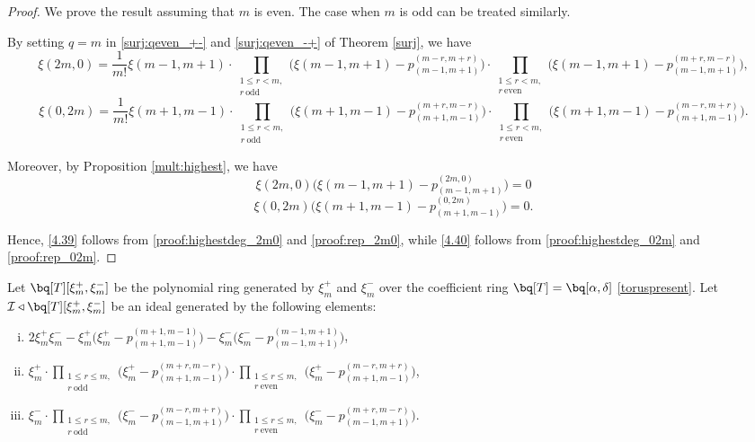 \documentclass[10pt, a4paper, reqno]{amsart}
\begin{document}
\begin{proof}
We prove the result assuming that $m$ is even. The case when $m$ is odd can be treated similarly.

By setting $q=m$ in \eqref{surj:qeven_+-} and \eqref{surj:qeven_-+} of Theorem \ref{surj}, we have 
	\begin{equation}\label{proof:rep_2m0}
	\xi(2m,0)=\displaystyle\frac{1}{ m!} \xi(m-1,m+1)\cdot\prod_{\substack{1\leq r< m ,\\ r~ \text{odd}}}\Big(\xi(m-1,m+1)-p^{(m-r,m+r)}_{(m-1,m+1)}\Big)\cdot\prod_{\substack{1\leq r< m,\\ r~ \text{even}}}\Big(\xi(m-1,m+1)-p^{(m+r,m-r)}_{(m-1,m+1)}\Big),
\end{equation}
\begin{equation}\label{proof:rep_02m}
	\xi(0,2m)=\displaystyle\frac{1}{m!}\xi(m+1,m-1)\cdot\prod_{\substack{1\leq r< m ,\\ r~ \text{odd}}}\Big(\xi(m+1,m-1)-p^{(m+r,m-r)}_{(m+1,m-1)}\Big)\cdot\prod_{\substack{1\leq r< m,\\ r~ \text{even}}}\Big(\xi(m+1,m-1)-p^{(m-r,m+r)}_{(m+1,m-1)}\Big).
\end{equation}

Moreover, by Proposition \ref{mult:highest}, we have
\begin{equation}\label{proof:highestdeg_2m0}	\xi(2m,0)\Big(\xi(m-1,m+1)-p_{(m-1,m+1)}^{(2m,0)}\Big)=0 \end{equation}	
\begin{equation}\label{proof:highestdeg_02m} \xi(0,2m)\Big(\xi(m+1,m-1)-p_{(m+1,m-1)}^{(0,2m)}\Big)=0.
\end{equation}

Hence, \eqref{4.39} follows from \eqref{proof:highestdeg_2m0} and \eqref{proof:rep_2m0}, while  \eqref{4.40} follows from \eqref{proof:highestdeg_02m} and \eqref{proof:rep_02m}.
\end{proof}




Let $\bq[T][\xi^+_m,\xi^-_m]$ be the polynomial ring generated by $\xi^+_m$ and $\xi^-_m$ over the coefficient ring $\bq[T]=\bq[\alpha,\delta]$ \eqref{toruspresent}. 
Let $\mathcal{I}\triangleleft \bq[T][\xi^+_m,\xi^-_m]$ be an ideal generated by the following  elements:
\begin{enumerate}[(i)]
	\item $			2\xi^+_m\xi^-_m-\xi^+_m\Big(\xi^+_m-p^{(m+1,m-1)}_{(m+1,m-1)}\Big)-\xi^-_m\Big(\xi^-_m-p^{(m-1,m+1)}_{(m-1,m+1)}\Big)$,
	\item $ \xi^+_m\cdot\prod_{\substack{1\leq r\leq m ,\\ r~ \text{odd}}}\Big(\xi^+_m-p^{(m+r,m-r)}_{(m+1,m-1)}\Big)\cdot\prod_{\substack{1 \leq r\leq m,\\ r~ \text{even}}}\Big(\xi^+_m-p^{(m-r,m+r)}_{(m+1,m-1)}\Big)$,
%
\item $ \xi^-_m \cdot\prod_{\substack{1\leq r\leq m ,\\ r~ \text{odd}}}\Big(\xi^-_m -p^{(m-r,m+r)}_{(m-1,m+1)}\Big)\cdot\prod_{\substack{1\leq r\leq m,\\ r~ \text{even}}}\Big(\xi^-_m -p^{(m+r,m-r)}_{(m-1,m+1)}\Big)$.
\end{enumerate}
\end{document}
